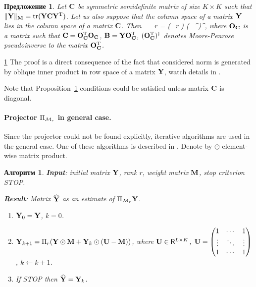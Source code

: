 \documentclass[12pt,a4paper,fleqn,leqno]{article}
\DeclareMathOperator{\tr}{tr}
\newtheorem{proposition}{Предложение}
\newtheorem{algorithm}{Алгоритм}
\begin{document}
\begin{proposition}
\label{prop:projS}
Let $\mathbf{C}$ be symmetric semidefinite matrix of size $K \times K$ such that $\|\bfY\|_\bfM = \tr(\bfY \bfC \bfY^\rmT)$.
Let us also suppose that the column space of a matrix $\mathbf{Y}$ lies in the column space of a matrix $\mathbf{C}$.
Then
\be
\label{eq:PiMr}
\Pi_{\calM_r} \bfY = (\Pi_r \bfB) (\bfO_\bfC^{\rmT})^\dagger,
\ee
where $\mathbf{O}_{\mathbf{C}}$ is a matrix such that $\mathbf{C} = \mathbf{O}_{\mathbf{C}}^{\mathrm{T}}\mathbf{O}_{\mathbf{C}}$,
$\mathbf{B} = \mathbf{Y} \mathbf{O}_{\mathbf{C}}^{\mathrm{T}}$, $(\mathbf{O}_{\mathbf{C}}^{\mathrm{T}})^\dagger$ denotes  Moore-Penrose pseudoinverse to the matrix $\mathbf{O}_{\mathbf{C}}^{\mathrm{T}}$.
\end{proposition}
\begin{proof5}{\ref{prop:projS}}
The proof is a direct consequence of the fact that considered norm is generated by oblique inner product in row space of a matrix $\mathbf{Y}$, watch details in \cite{Golyandina2013}.
\end{proof5}

\begin{remark}
Note that Proposition~\ref{prop:projS} conditions could be satisfied unless matrix $\mathbf{C}$ is diagonal.
\end{remark}

\paragraph{Projector $\Pi_{\mathcal{M}_r}$ in general case.}
Since the projector could not be found explicitly, iterative algorithms are used in the general case.
One of these algorithms is described in \cite{Srebro2003}. Denote by $\odot$ element-wise matrix product.

\begin{algorithm}
\label{alg:weightedSVD}
\textbf{Input}: initial matrix $\mathbf{Y}$, rank $r$, weight matrix $\mathbf{M}$,
stop criterion STOP.

\textbf{Result}:
Matrix $\widehat{\mathbf{Y}}$ as an estimate of $\Pi_{\mathcal{M}_r} \mathbf{Y}$.

\begin{enumerate}
\item
$\mathbf{Y}_0 = \mathbf{Y}$, $k=0$.
\item
$\mathbf{Y}_{k+1} = \Pi_r(\mathbf{Y} \odot \mathbf{M} + \mathbf{Y}_{k} \odot (\mathbf{U} -  \mathbf{M}))$, where
$\mathbf{U} \in \mathsf{R}^{L \times K}$,  $\mathbf{U} = \begin{pmatrix}
1 & \cdots & 1 \\
\vdots & \ddots & \vdots \\
1 & \cdots & 1
\end{pmatrix}$, $k\leftarrow k+1$.
\item
If STOP then $\widehat{\mathbf{Y}} = \mathbf{Y}_k$.
\end{enumerate}
\end{algorithm}
\end{document}

